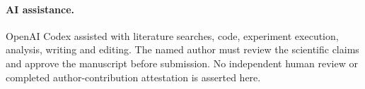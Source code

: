 \documentclass[11pt]{article}
\begin{document}
\paragraph{AI assistance.} OpenAI Codex assisted with literature searches, code, experiment execution, analysis, writing and editing. The named author must review the scientific claims and approve the manuscript before submission. No independent human review or completed author-contribution attestation is asserted here.
\begingroup\small

\endgroup
\end{document}
